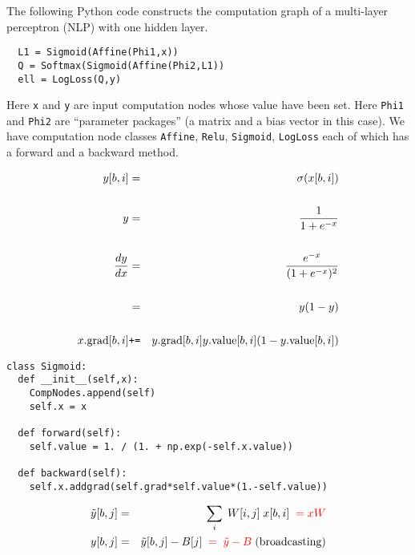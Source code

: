 {
\medskip

The following Python code constructs the computation graph of a multi-layer perceptron (NLP) with one hidden layer.

\vfill
\begin{verbatim}
  L1 = Sigmoid(Affine(Phi1,x))
  Q = Softmax(Sigmoid(Affine(Phi2,L1))
  ell = LogLoss(Q,y)
\end{verbatim}

\vfill
Here {\tt x} and {\tt y} are input computation nodes
whose value have been set.
Here {\tt Phi1} and {\tt Phi2} are ``parameter packages'' (a matrix and a bias vector in this case).
We have computation node classes {\tt Affine}, {\tt Relu}, {\tt Sigmoid}, {\tt LogLoss} each of which has
a forward and a backward method.


\begin{eqnarray*}
y[b,i] & = &  \sigma(x[b,i]) \\
\\
y & = & \frac{1}{1 + e^{-x}} \\
\\
\frac{d y}{dx} & = & \frac{e^{-x}}{(1 + e^{-x})^2} \\
\\
& = & y(1-y) \\
\\
x.\mathrm{grad}[b,i] & \mbox{\tt +=} & y.\mathrm{grad}[b,i]y.\mathrm{value}[b,i](1-y.\mathrm{value}[b,i])
\end{eqnarray*}




\begin{verbatim}
class Sigmoid:
  def __init__(self,x):
    CompNodes.append(self)
    self.x = x

  def forward(self):
    self.value = 1. / (1. + np.exp(-self.x.value))

  def backward(self):
    self.x.addgrad(self.grad*self.value*(1.-self.value))
\end{verbatim}


\vspace{-3ex}
\begin{eqnarray*}
  \tilde{y}[b,j] & = & \sum_i\;W[i,j]\;x[b,i] {\color{red}\;\; = xW}  \\
  y[b,j] & = & \tilde{y}[b,j] - B[j] {\color{red} \;\;=\;\tilde{y} - B}\; \mathrm{(broadcasting)}
  \end{eqnarray*}

}
